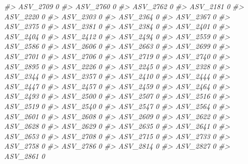 \documentclass[
]{article}
\newenvironment{Shaded}{\begin{snugshade}}{\end{snugshade}}
\newcommand{\CommentTok}[1]{\textcolor[rgb]{0.56,0.35,0.01}{\textit{#1}}}
\begin{document}
\begin{Shaded}
\begin{Highlighting}[]
\CommentTok{\#\textgreater{} ASV\_2709  0}
\CommentTok{\#\textgreater{} ASV\_2760  0}
\CommentTok{\#\textgreater{} ASV\_2762  0}
\CommentTok{\#\textgreater{} ASV\_2181  0}
\CommentTok{\#\textgreater{} ASV\_2220  0}
\CommentTok{\#\textgreater{} ASV\_2303  0}
\CommentTok{\#\textgreater{} ASV\_2364  0}
\CommentTok{\#\textgreater{} ASV\_2367  0}
\CommentTok{\#\textgreater{} ASV\_2375  0}
\CommentTok{\#\textgreater{} ASV\_2381  0}
\CommentTok{\#\textgreater{} ASV\_2384  0}
\CommentTok{\#\textgreater{} ASV\_2401  0}
\CommentTok{\#\textgreater{} ASV\_2404  0}
\CommentTok{\#\textgreater{} ASV\_2412  0}
\CommentTok{\#\textgreater{} ASV\_2494  0}
\CommentTok{\#\textgreater{} ASV\_2559  0}
\CommentTok{\#\textgreater{} ASV\_2586  0}
\CommentTok{\#\textgreater{} ASV\_2606  0}
\CommentTok{\#\textgreater{} ASV\_2663  0}
\CommentTok{\#\textgreater{} ASV\_2699  0}
\CommentTok{\#\textgreater{} ASV\_2701  0}
\CommentTok{\#\textgreater{} ASV\_2706  0}
\CommentTok{\#\textgreater{} ASV\_2719  0}
\CommentTok{\#\textgreater{} ASV\_2740  0}
\CommentTok{\#\textgreater{} ASV\_2895  0}
\CommentTok{\#\textgreater{} ASV\_2226  0}
\CommentTok{\#\textgreater{} ASV\_2245  0}
\CommentTok{\#\textgreater{} ASV\_2328  0}
\CommentTok{\#\textgreater{} ASV\_2344  0}
\CommentTok{\#\textgreater{} ASV\_2357  0}
\CommentTok{\#\textgreater{} ASV\_2410  0}
\CommentTok{\#\textgreater{} ASV\_2444  0}
\CommentTok{\#\textgreater{} ASV\_2447  0}
\CommentTok{\#\textgreater{} ASV\_2457  0}
\CommentTok{\#\textgreater{} ASV\_2459  0}
\CommentTok{\#\textgreater{} ASV\_2464  0}
\CommentTok{\#\textgreater{} ASV\_2493  0}
\CommentTok{\#\textgreater{} ASV\_2500  0}
\CommentTok{\#\textgreater{} ASV\_2507  0}
\CommentTok{\#\textgreater{} ASV\_2516  0}
\CommentTok{\#\textgreater{} ASV\_2519  0}
\CommentTok{\#\textgreater{} ASV\_2540  0}
\CommentTok{\#\textgreater{} ASV\_2547  0}
\CommentTok{\#\textgreater{} ASV\_2564  0}
\CommentTok{\#\textgreater{} ASV\_2601  0}
\CommentTok{\#\textgreater{} ASV\_2608  0}
\CommentTok{\#\textgreater{} ASV\_2609  0}
\CommentTok{\#\textgreater{} ASV\_2622  0}
\CommentTok{\#\textgreater{} ASV\_2628  0}
\CommentTok{\#\textgreater{} ASV\_2629  0}
\CommentTok{\#\textgreater{} ASV\_2635  0}
\CommentTok{\#\textgreater{} ASV\_2641  0}
\CommentTok{\#\textgreater{} ASV\_2653  0}
\CommentTok{\#\textgreater{} ASV\_2708  0}
\CommentTok{\#\textgreater{} ASV\_2715  0}
\CommentTok{\#\textgreater{} ASV\_2733  0}
\CommentTok{\#\textgreater{} ASV\_2758  0}
\CommentTok{\#\textgreater{} ASV\_2786  0}
\CommentTok{\#\textgreater{} ASV\_2814  0}
\CommentTok{\#\textgreater{} ASV\_2827  0}
\CommentTok{\#\textgreater{} ASV\_2861  0}

\end{Highlighting}
\end{Shaded}
\end{document}
